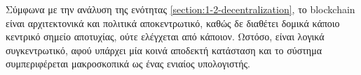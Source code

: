 Σύμφωνα με την ανάλυση της ενότητας \ref{section:1-2-decentralization}, το blockchain είναι αρχιτεκτονικά και πολιτικά αποκεντρωτικό, καθώς δε διαθέτει δομικά κάποιο κεντρικό σημείο αποτυχίας, ούτε ελέγχεται από κάποιον. Ωστόσο, είναι λογικά συγκεντρωτικό, αφού υπάρχει μία κοινά αποδεκτή κατάσταση και το σύστημα συμπεριφέρεται μακροσκοπικά ως ένας ενιαίος υπολογιστής.
